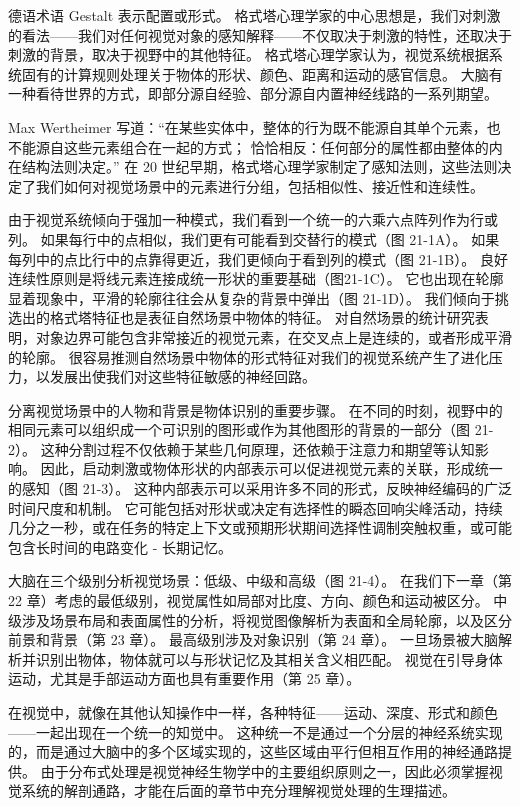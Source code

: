 德语术语 Gestalt 表示配置或形式。 格式塔心理学家的中心思想是，我们对刺激的看法——我们对任何视觉对象的感知解释——不仅取决于刺激的特性，还取决于刺激的背景，取决于视野中的其他特征。 格式塔心理学家认为，视觉系统根据系统固有的计算规则处理关于物体的形状、颜色、距离和运动的感官信息。 大脑有一种看待世界的方式，即部分源自经验、部分源自内置神经线路的一系列期望。

Max Wertheimer 写道：“在某些实体中，整体的行为既不能源自其单个元素，也不能源自这些元素组合在一起的方式； 恰恰相反：任何部分的属性都由整体的内在结构法则决定。” 在 20 世纪早期，格式塔心理学家制定了感知法则，这些法则决定了我们如何对视觉场景中的元素进行分组，包括相似性、接近性和连续性。

由于视觉系统倾向于强加一种模式，我们看到一个统一的六乘六点阵列作为行或列。 如果每行中的点相似，我们更有可能看到交替行的模式（图 21-1A）。 如果每列中的点比行中的点靠得更近，我们更倾向于看到列的模式（图 21-1B）。 良好连续性原则是将线元素连接成统一形状的重要基础（图21-1C）。 它也出现在轮廓显着现象中，平滑的轮廓往往会从复杂的背景中弹出（图 21-1D）。 我们倾向于挑选出的格式塔特征也是表征自然场景中物体的特征。 对自然场景的统计研究表明，对象边界可能包含非常接近的视觉元素，在交叉点上是连续的，或者形成平滑的轮廓。 很容易推测自然场景中物体的形式特征对我们的视觉系统产生了进化压力，以发展出使我们对这些特征敏感的神经回路。

分离视觉场景中的人物和背景是物体识别的重要步骤。 在不同的时刻，视野中的相同元素可以组织成一个可识别的图形或作为其他图形的背景的一部分（图 21-2）。 这种分割过程不仅依赖于某些几何原理，还依赖于注意力和期望等认知影响。 因此，启动刺激或物体形状的内部表示可以促进视觉元素的关联，形成统一的感知（图 21-3）。 这种内部表示可以采用许多不同的形式，反映神经编码的广泛时间尺度和机制。 它可能包括对形状或决定有选择性的瞬态回响尖峰活动，持续几分之一秒，或在任务的特定上下文或预期形状期间选择性调制突触权重，或可能包含长时间的电路变化 - 长期记忆。

大脑在三个级别分析视觉场景：低级、中级和高级（图 21-4）。 在我们下一章（第 22 章）考虑的最低级别，视觉属性如局部对比度、方向、颜色和运动被区分。 中级涉及场景布局和表面属性的分析，将视觉图像解析为表面和全局轮廓，以及区分前景和背景（第 23 章）。 最高级别涉及对象识别（第 24 章）。 一旦场景被大脑解析并识别出物体，物体就可以与形状记忆及其相关含义相匹配。 视觉在引导身体运动，尤其是手部运动方面也具有重要作用（第 25 章）。

在视觉中，就像在其他认知操作中一样，各种特征——运动、深度、形式和颜色——一起出现在一个统一的知觉中。 这种统一不是通过一个分层的神经系统实现的，而是通过大脑中的多个区域实现的，这些区域由平行但相互作用的神经通路提供。 由于分布式处理是视觉神经生物学中的主要组织原则之一，因此必须掌握视觉系统的解剖通路，才能在后面的章节中充分理解视觉处理的生理描述。

